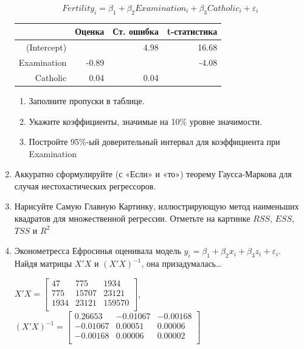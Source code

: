 \documentclass[12pt, a4paper]{article}\usepackage[]{graphicx}\usepackage[]{color}
\begin{document}
\begin{enumerate}
\[Fertility_i=\beta_1+\beta_2 Examination_i+\beta_3 Catholic_i+\varepsilon_i\]



\begin{table}[ht]
\centering
\begin{tabular}{rrrr}
  \hline
 & Оценка & Ст. ошибка & t-статистика \\ 
  \hline
(Intercept) &  & 4.98 & 16.68 \\ 
  Examination & -0.89 &  & -4.08 \\ 
  Catholic & 0.04 & 0.04 &  \\ 
   \hline
\end{tabular}
\end{table}


\begin{enumerate}
\item Заполните пропуски в таблице.
\item Укажите коэффициенты, значимые на 10\% уровне значимости.
\item Постройте 95\%-ый доверительный интервал для коэффициента при Examination
\end{enumerate}

\item Аккуратно сформулируйте (с «Если» и «то») теорему Гаусса-Маркова для случая нестохастических регрессоров.

\item Нарисуйте Самую Главную Картинку, иллюстрирующую метод наименьших квадратов для множественной регрессии. Отметьте на картинке $RSS$, $ESS$, $TSS$ и $R^2$

\item Эконометресса Ефросинья оценивала модель $y_i=\beta_1 + \beta_2 x_i + \beta_3 z_i + \varepsilon_i$. Найдя матрицы $X'X$ и $(X'X)^{-1}$, она призадумалась\ldots

$X'X = \begin{bmatrix}{}
  47 & 775 & 1934 \\
  775 & 15707 & 23121 \\
  1934 & 23121 & 159570 \\
  \end{bmatrix}$,
$(X'X)^{-1}=\begin{bmatrix}{}
  0.26653 & -0.01067 & -0.00168 \\
  -0.01067 & 0.00051 & 0.00006 \\
  -0.00168 & 0.00006 & 0.00002 \\
  \end{bmatrix}$



\end{enumerate}
\end{document}
